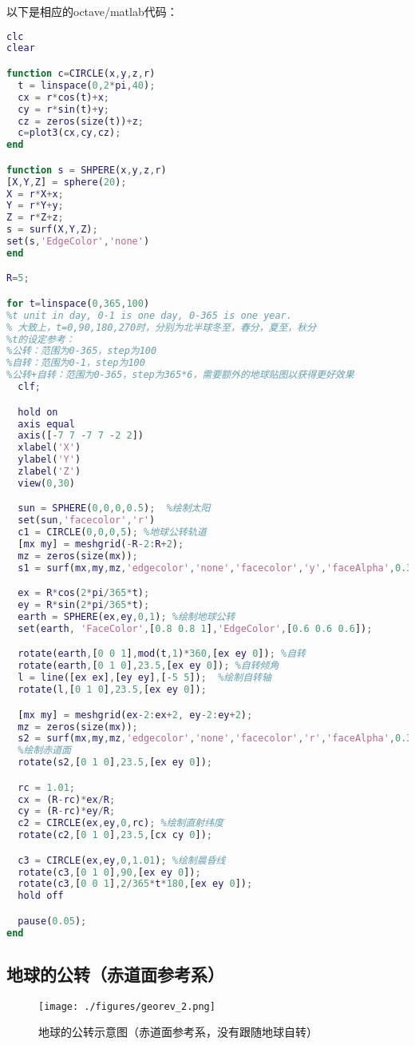 以下是相应的octave/matlab代码：
\begin{lstlisting}[language=matlab]
clc
clear

function c=CIRCLE(x,y,z,r)
  t = linspace(0,2*pi,40);
  cx = r*cos(t)+x;
  cy = r*sin(t)+y;
  cz = zeros(size(t))+z;
  c=plot3(cx,cy,cz);
end

function s = SHPERE(x,y,z,r)
[X,Y,Z] = sphere(20);
X = r*X+x;
Y = r*Y+y;
Z = r*Z+z;
s = surf(X,Y,Z);
set(s,'EdgeColor','none')
end

R=5;

for t=linspace(0,365,100)
%t unit in day, 0-1 is one day, 0-365 is one year.
% 大致上，t=0,90,180,270时，分别为北半球冬至，春分，夏至，秋分
%t的设定参考：
%公转：范围为0-365，step为100
%自转：范围为0-1，step为100
%公转+自转：范围为0-365，step为365*6，需要额外的地球贴图以获得更好效果
  clf;

  hold on
  axis equal
  axis([-7 7 -7 7 -2 2])
  xlabel('X')
  ylabel('Y')
  zlabel('Z')
  view(0,30)

  sun = SPHERE(0,0,0,0.5);  %绘制太阳
  set(sun,'facecolor','r')
  c1 = CIRCLE(0,0,0,5); %地球公转轨道
  [mx my] = meshgrid(-R-2:R+2);
  mz = zeros(size(mx));
  s1 = surf(mx,my,mz,'edgecolor','none','facecolor','y','faceAlpha',0.3); %黄道面

  ex = R*cos(2*pi/365*t);
  ey = R*sin(2*pi/365*t);
  earth = SPHERE(ex,ey,0,1); %绘制地球公转
  set(earth, 'FaceColor',[0.8 0.8 1],'EdgeColor',[0.6 0.6 0.6]);

  rotate(earth,[0 0 1],mod(t,1)*360,[ex ey 0]); %自转
  rotate(earth,[0 1 0],23.5,[ex ey 0]); %自转倾角
  l = line([ex ex],[ey ey],[-5 5]);  %绘制自转轴
  rotate(l,[0 1 0],23.5,[ex ey 0]);

  [mx my] = meshgrid(ex-2:ex+2, ey-2:ey+2);
  mz = zeros(size(mx));
  s2 = surf(mx,my,mz,'edgecolor','none','facecolor','r','faceAlpha',0.3);
  %绘制赤道面
  rotate(s2,[0 1 0],23.5,[ex ey 0]);

  rc = 1.01;
  cx = (R-rc)*ex/R;
  cy = (R-rc)*ey/R;
  c2 = CIRCLE(ex,ey,0,rc); %绘制直射纬度
  rotate(c2,[0 1 0],23.5,[cx cy 0]);

  c3 = CIRCLE(ex,ey,0,1.01); %绘制晨昏线
  rotate(c3,[0 1 0],90,[ex ey 0]);
  rotate(c3,[0 0 1],2/365*t*180,[ex ey 0]);
  hold off

  pause(0.05);
end
\end{lstlisting}

\subsection{地球的公转（赤道面参考系）}
\begin{figure}[ht]
\centering
\texttt{[image: ./figures/georev\_2.png]}
\caption{地球的公转示意图（赤道面参考系，没有跟随地球自转）} \label{georev_fig2}
\end{figure}

